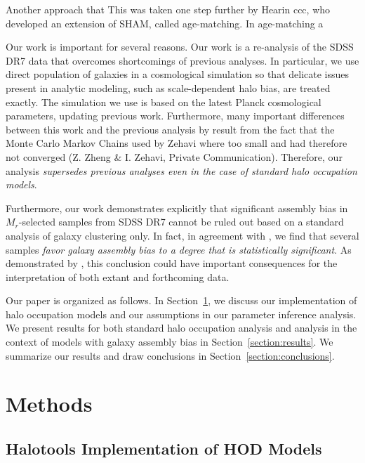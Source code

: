 \documentclass[usenatbib,usegraphicx,letterpaper]{mn2e}
\begin{document}
Another approach that 
This was taken one step further by Hearin ccc, who developed an
extension of SHAM, called age-matching. In age-matching a 




Our work is important for several reasons. Our work is a re-analysis
of the SDSS DR7 data that overcomes shortcomings of previous
analyses. In particular, we use direct population of galaxies in a
cosmological simulation so that delicate issues present in analytic
modeling, such as scale-dependent halo bias, are treated exactly.  The
simulation we use is based on the latest Planck cosmological
parameters, updating previous work. Furthermore, many important
differences between this work and the previous analysis by
\citet{zehavi_etal11} result from the fact that the Monte Carlo Markov
Chains used by Zehavi \etal where too small and had therefore not
converged (Z. Zheng \& I. Zehavi, Private Communication).  Therefore,
our analysis {\em supersedes previous analyses even in the case of
  standard halo occupation models}.

Furthermore, our work demonstrates explicitly that significant
assembly bias in $M_r$-selected samples from SDSS DR7 cannot be ruled
out based on a standard analysis of galaxy clustering only. In fact,
in agreement with \citet{lehmann_etal15}, we find that several samples
{\em favor galaxy assembly bias to a degree that is statistically
  significant}. As demonstrated by \citet{zentner_etal14}, this
conclusion could have important consequences for the interpretation of
both extant and forthcoming data.

Our paper is organized as follows. In Section~\ref{section:methods},
we discuss our implementation of halo occupation models and our
assumptions in our parameter inference analysis. We present results
for both standard halo occupation analysis and analysis in the context
of models with galaxy assembly bias in
Section~\ref{section:results}. We summarize our results and draw
conclusions in Section~\ref{section:conclusions}.

\section{Methods}
\label{section:methods}

\subsection{Halotools Implementation of HOD Models}
\label{subsection:halotools}
\end{document}
